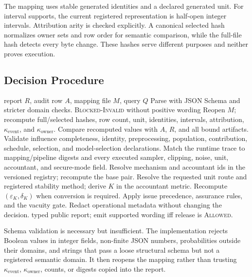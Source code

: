 \documentclass[letterpaper]{article} %
\newcommand{\ke}{\kappa_{\mathrm{event}}}
\newcommand{\ko}{\kappa_{\mathrm{owner}}}
\newcommand{\epsK}{\varepsilon_K}
\newcommand{\delK}{\delta_K}
\begin{document}
The mapping uses stable generated identities and a declared generated unit.
For interval supports, the current registered representation is half-open
integer intervals.  Attribution arity is checked explicitly.  A canonical
selected hash normalizes owner sets and row order for semantic comparison,
while the full-file hash detects every byte change.  These hashes serve
different purposes and neither proves execution.

\subsection{Decision Procedure}

\begin{algorithm}[t]
\caption{Evidence-to-wording validation for one query}
\label{alg:supp-validator}
\begin{algorithmic}[1]
\REQUIRE report $R$, audit row $A$, mapping file $M$, query $Q$
\STATE Parse with JSON Schema and stricter domain checks.
  \RETURN \textsc{Blocked-Invalid} without positive wording
\ENDIF
\STATE Reopen $M$; recompute full/selected hashes, row count, unit,
identities, intervals, attribution, $\ke$, and $\ko$.
\STATE Compare recomputed values with $A$, $R$, and all bound artifacts.
\STATE Validate influence completeness, identity, preprocessing, population,
contribution, schedule, selection, and model-selection declarations.
\STATE Match the runtime trace to mapping/pipeline digests and every executed
sampler, clipping, noise, unit, accountant, and secure-mode field.
\STATE Resolve mechanism and accountant ids in the versioned registry;
recompute the base pair.
\STATE Resolve the requested unit route and registered stability method;
derive $K$ in the accountant metric.
\STATE Recompute $(\epsK,\delK)$ when conversion is required.
\STATE Apply issue precedence, assurance rules, and the vacuity gate.
\STATE Redact operational metadata without changing the decision.
\RETURN typed public report; emit supported wording iff release is
\textsc{Allowed}.
\end{algorithmic}
\end{algorithm}

Schema validation is necessary but insufficient.  The implementation rejects
Boolean values in integer fields, non-finite JSON numbers, probabilities
outside their domains, and strings that pass a loose structural schema but
not a registered semantic domain.  It then reopens the mapping rather than
trusting $\ke$, $\ko$, counts, or digests copied into the report.
\end{document}
